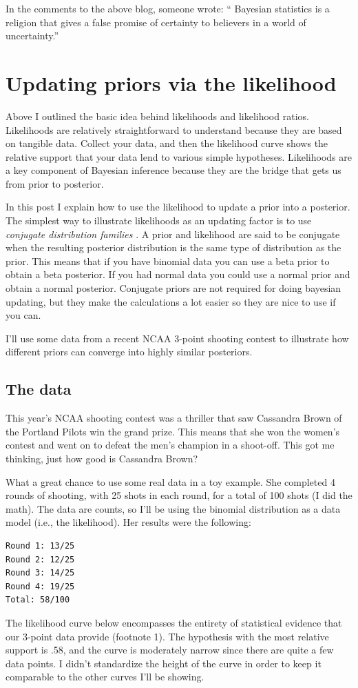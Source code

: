 In the comments to the above blog, someone wrote:
`` Bayesian statistics is a religion that gives a false promise of certainty to believers in a world of uncertainty.''



\section{Updating priors via the likelihood}
\label{sec:Updatingpriorsviathelikelihood}

Above I outlined the basic idea behind likelihoods and likelihood ratios. Likelihoods are relatively straightforward to understand because they are based on tangible data. Collect your data, and then the likelihood curve shows the relative support that your data lend to various simple hypotheses. Likelihoods are a key component of Bayesian inference because they are the bridge that gets us from prior to posterior.

In this post I explain how to use the likelihood to update a prior into a posterior. The simplest way to illustrate likelihoods as an updating factor is to use \textit{conjugate distribution families} \cite{Raiffa2000}. A prior and likelihood are said to be conjugate when the resulting posterior distribution is the same type of distribution as the prior. This means that if you have binomial data you can use a beta prior to obtain a beta posterior. If you had normal data you could use a normal prior and obtain a normal posterior. Conjugate priors are not required for doing bayesian updating, but they make the calculations a lot easier so they are nice to use if you can.

I'll use some data from a recent NCAA 3-point shooting contest to illustrate how different priors can converge into highly similar posteriors.

\subsection{The data}

This year's NCAA shooting contest was a thriller that saw Cassandra Brown of the Portland Pilots win the grand prize. This means that she won the women's contest and went on to defeat the men's champion in a shoot-off. This got me thinking, just how good is Cassandra Brown?

What a great chance to use some real data in a toy example. She completed 4 rounds of shooting, with 25 shots in each round, for a total of 100 shots (I did the math). The data are counts, so I'll be using the binomial distribution as a data model (i.e., the likelihood). Her results were the following:
\begin{lstlisting}
Round 1: 13/25               
Round 2: 12/25               
Round 3: 14/25               
Round 4: 19/25
Total: 58/100
\end{lstlisting}
The likelihood curve below encompasses the entirety of statistical evidence that our 3-point data provide (footnote 1). The hypothesis with the most relative support is .58, and the curve is moderately narrow since there are quite a few data points. I didn't standardize the height of the curve in order to keep it comparable to the other curves I'll be showing.


